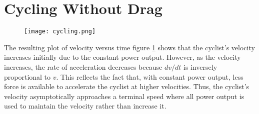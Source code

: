 \documentclass{article}
\begin{document}
\section{Cycling Without Drag}
\begin{figure}[h!] 
    \texttt{[image: cycling.png]} 
    \label{cycling}
\end{figure} 
The resulting plot of velocity versus time figure \ref{cycling} shows that the cyclist’s velocity increases initially due to the constant power output. However, as the velocity increases, the rate of acceleration decreases because $dv/dt$ is inversely proportional to $v$. This reflects the fact that, with constant power output, less force is available to accelerate the cyclist at higher velocities. Thus, the cyclist’s velocity asymptotically approaches a terminal speed where all power output is used to maintain the velocity rather than increase it. 
\end{document}
